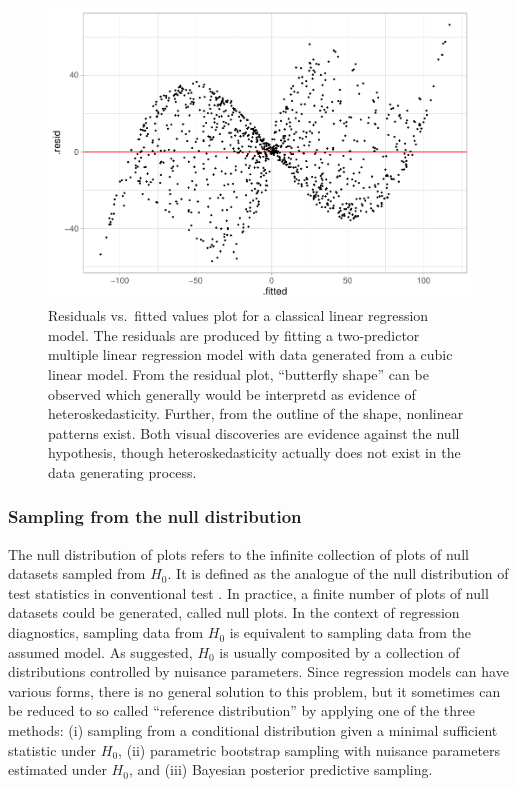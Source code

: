 \documentclass[]{interact}
\theoremstyle{plain}%
\theoremstyle{definition}
\theoremstyle{remark}
\begin{document}
\begin{figure}
\centering
\includegraphics{paper_comparison_files/figure-latex/residual-plot-cubic-heter-1.pdf}
\caption{Residuals vs.~fitted values plot for a classical linear
regression model. The residuals are produced by fitting a two-predictor
multiple linear regression model with data generated from a cubic linear
model. From the residual plot, ``butterfly shape'' can be observed which
generally would be interpretd as evidence of heteroskedasticity.
Further, from the outline of the shape, nonlinear patterns exist. Both
visual discoveries are evidence against the null hypothesis, though
heteroskedasticity actually does not exist in the data generating
process.}
\end{figure}

\hypertarget{se:sampling-from-null}{%
\subsubsection{Sampling from the null
distribution}\label{se:sampling-from-null}}

The null distribution of plots refers to the infinite collection of
plots of null datasets sampled from \(H_0\). It is defined as the
analogue of the null distribution of test statistics in conventional
test \citep{buja_statistical_2009}. In practice, a finite number of
plots of null datasets could be generated, called null plots. In the
context of regression diagnostics, sampling data from \(H_0\) is
equivalent to sampling data from the assumed model. As
\citet{buja_statistical_2009} suggested, \(H_0\) is usually composited
by a collection of distributions controlled by nuisance parameters.
Since regression models can have various forms, there is no general
solution to this problem, but it sometimes can be reduced to so called
``reference distribution'' by applying one of the three methods: (i)
sampling from a conditional distribution given a minimal sufficient
statistic under \(H_0\), (ii) parametric bootstrap sampling with
nuisance parameters estimated under \(H_0\), and (iii) Bayesian
posterior predictive sampling.
\end{document}
